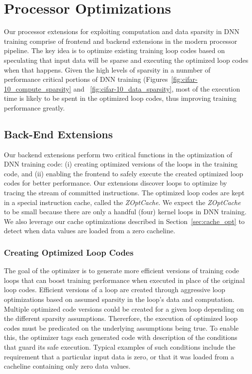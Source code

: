 \section{Processor Optimizations}
\label{sec:processor_opt}

Our processor extensions for exploiting computation and data sparsity in DNN training comprise of frontend and backend extensions in the modern processor pipeline.  The key idea is to optimize existing training loop codes based on speculating that input data will be sparse and executing the optimized loop codes when that happens.  Given the high levels of sparsity in a nunmber of  performance critical portions of DNN training (Figures~\ref{fig:cifar-10_compute_sparsity} and ~\ref{fig:cifar-10_data_sparsity}, most of the execution time is likely to be spent in the optimized loop codes, thus improving training performance greatly. 

\subsection{Back-End Extensions}
Our backend extensions perform two critical functions in the optimization of DNN training code: (i) creating optimized versions of the loops in the training code, and (ii)  enabling the frontend to safely execute the created optimized loop codes for better performance.  Our extensions discover loops to optimize by tracing the stream of committed instructions. The optimized loop codes are kept in a special instruction cache, called the {\it ZOptCache}. We expect the {\it ZOptCache} to be small because there are only a handful (four) kernel loops in DNN training.   We also leverage our cache optimizations described in Section~\ref{sec:cache_opt} to detect when data values are loaded from a zero cacheline. 

\subsubsection{Creating Optimized Loop Codes}
The goal of the optimizer is to generate more efficient versions of training code loops that can boost training performance when executed in place of the original loop codes.  Efficient versions of a loop are created through aggressive loop optimizations based on assumed sparsity in the  loop's data and computation. Multiple optimized code versions could be created for a given loop depending on the different sparsity assumptions.  Thererfore, the execution of optimized loop codes must be predicated on the underlying assumptions being true.  To enable this, the optimizer tags each generated code with description of the conditions that guard its safe execution.  Typical examples of such conditions include the requirement that a particular input data is zero, or that it was loaded from a cacheline containing only zero data values. 

